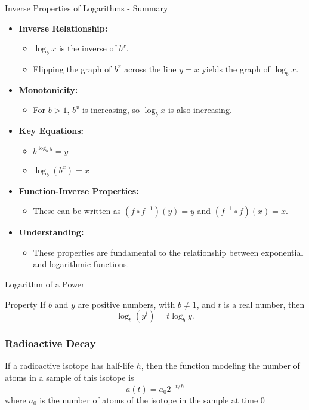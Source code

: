   \begin{frame}{Inverse Properties of Logarithms - Summary}
    \begin{itemize}
      \item \textbf{Inverse Relationship:}
        \begin{itemize}
          \item \(\log_b x\) is the inverse of \(b^x\).
          \item Flipping the graph of \(b^x\) across the line \(y=x\) yields the graph of \(\log_b x\).
        \end{itemize}
      \item \textbf{Monotonicity:}
        \begin{itemize}
          \item For \(b>1\), \(b^x\) is increasing, so \(\log_b x\) is also increasing.
        \end{itemize}
      \item \textbf{Key Equations:}
        \begin{itemize}
          \item \(b^{\log_b y} = y\)
          \item \(\log_b (b^x) = x\)
        \end{itemize}
      \item \textbf{Function-Inverse Properties:}
        \begin{itemize}
          \item These can be written as \((f \circ f^{-1})(y) = y\) and \((f^{-1} \circ f)(x) = x\).
        \end{itemize}
      \item \textbf{Understanding:}
        \begin{itemize}
          \item These properties are fundamental to the relationship between exponential and logarithmic functions.
        \end{itemize}
    \end{itemize}
  \end{frame}

  \begin{frame}{Logarithm of a Power}
    \begin{block}{Property}
      If \(b\) and \(y\) are positive numbers, with \(b \neq 1\), and \(t\) is a real number, then
      \[
        \log_b\left(y^t\right) = t \log_b y.
      \]
    \end{block}
  \end{frame}
\begin{frame}
  \frametitle{Radioactive Decay}
  If a radioactive isotope has half-life \(h\), then the function modeling the number of
  atoms in a sample of this isotope is
  \[ a(t) = a_{0}2^{-t/h}\]
  where \(a_{0}\) is the number of atoms of the isotope in the sample at time \(0\)
  \end{frame} 


